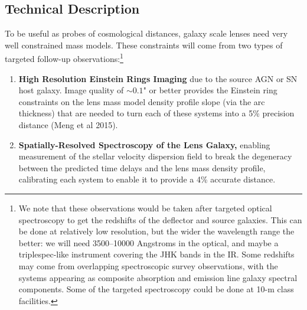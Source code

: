 
\subsection{Technical Description }




To be useful as probes of cosmological distances, galaxy scale lenses
need very well constrained mass models. These constraints will come from
two types of targeted follow-up observations:\footnote{
We note that these observations would be taken after targeted optical
spectroscopy to get the redshifts of the deflector and source galaxies.
This can be done at relatively low resolution, but the wider the
wavelength range the better: we will need 3500--10000 Angstroms in the
optical, and maybe a triplespec-like instrument covering the JHK bands
in the IR. Some redshifts may come from overlapping spectroscopic survey
observations, with the systems appearing as composite absorption and
emission line galaxy spectral components. Some of the targeted
spectroscopy could be done at 10-m class facilities.}
\begin{enumerate}
    \item {\bf High Resolution Einstein Rings Imaging} due to the
    source AGN or SN host galaxy. Image quality of $\sim0.1$" or better
    provides the Einstein ring constraints on the lens mass model
    density profile slope (via the arc thickness) that are
    needed to turn each of these systems into a  5\% precision distance
    (Meng et al 2015).
    \item {\bf Spatially-Resolved Spectroscopy of the Lens Galaxy,} enabling
    measurement of the stellar velocity dispersion field to break the
    degeneracy between the predicted time delays and the lens mass
    density profile, calibrating each system to enable it to provide a
    4\% accurate distance.
\end{enumerate}

